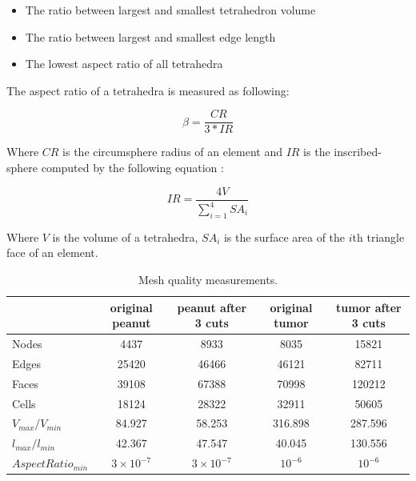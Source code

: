 \begin{itemize}
 \item The ratio between largest and smallest tetrahedron volume
 \item The ratio between largest and smallest edge length
 \item The lowest aspect ratio of all tetrahedra 
\end{itemize}

The aspect ratio of a tetrahedra is measured as following:

\begin{equation}
\beta = \frac{CR}{3*IR} 
\end{equation}

Where $CR$ is the circumsphere radius of an element and $IR$ is the inscribed-sphere computed by the following equation 
\cite{parthasarathy1994comparison}:

\begin{equation}
IR = \frac{4V}{\sum_{i=1}^{4} SA_i}
\end{equation}

Where $V$ is the volume of a tetrahedra, $SA_i$ is the surface area of the $i$th triangle face of an element.
 
\begin{table}[H]
\begin{center}
\caption{\label{table:meshquality}{Mesh quality measurements.}}
  \begin{tabular}{ | l | c | c || c | c |}
    \hline    
     & original peanut & peanut after 3 cuts & original tumor & tumor after 3 cuts \\ \hline \hline    
    Nodes & 4437 & 8933 & 8035 & 15821  \\ \hline
    Edges & 25420 & 46466 & 46121 & 82711 \\ \hline
    Faces & 39108 & 67388 & 70998 & 120212 \\ \hline
    Cells & 18124 & 28322 & 32911 & 50605 \\ \hline
    $V_{max} / V_{min}$ & 84.927 & 58.253 & 316.898 & 287.596 \\ \hline
    $l_{max} / l_{min}$ & 42.367 & 47.547 & 40.045 & 130.556 \\ \hline
    $AspectRatio_{min}$ & $3 \times 10^{-7}$ & $3 \times 10^{-7}$ & $10^{-6}$ & $10^{-6}$ \\ \hline
    \hline
  \end{tabular}
\end{center}
\end{table}

